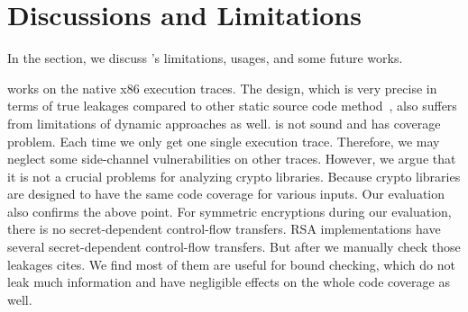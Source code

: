 \section{Discussions and Limitations}
In the section, we discuss \tool's limitations, usages, and
some future works.

\tool{} works on the native x86 execution traces. The design,
which is very precise in terms of true leakages compared to other
static source code method~\cite{197207,BacelarAlmeida:2013:FVS:2483313.2483334}, 
also suffers from limitations of dynamic approaches as well.
\tool{} is not sound and has coverage problem. Each time we only 
get one single execution trace. Therefore, we may neglect 
some side-channel vulnerabilities on other traces. However,
we argue that it is not a crucial problems for analyzing crypto
libraries. Because crypto libraries are designed to have the same
code coverage for various inputs. Our evaluation also confirms 
the above point. For symmetric encryptions during our evaluation, 
there is no secret-dependent control-flow transfers. RSA implementations
have several secret-dependent control-flow transfers. But after we 
manually check those leakages cites. We find most of them are useful
for bound checking, which do not leak much information and have 
negligible effects on the whole code coverage as well.



